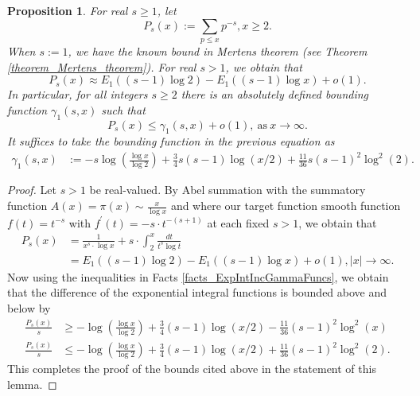\documentclass[11pt,reqno,a4letter]{article}
\numberwithin{figure}{section}
\numberwithin{table}{section}
\theoremstyle{plain}
\newtheorem{prop}[theorem]{Proposition}
\numberwithin{theorem}{section}
\theoremstyle{definition}
\newcommand{\NBRef}[1]{}
\begin{document}
\begin{prop} 
\label{cor_PartialSumsOfReciprocalsOfPrimePowers} 
For real $s \geq 1$, let 
\[
P_s(x) := \sum_{p \leq x} p^{-s}, x \geq 2. 
\]
When $s := 1$, we have the known bound in Mertens theorem 
(see Theorem \ref{theorem_Mertens_theorem}). For real $s > 1$, we obtain that 
\[
P_s(x) \approx E_1((s-1) \log 2) - E_1((s-1) \log x) + o(1). 
\]
In particular, for all integers $s \geq 2$ 
there is an absolutely defined bounding function $\gamma_1(s, x)$ such that 
\[
P_s(x) \leq \gamma_1(s, x) + o(1), \mathrm{\ as\ } x \rightarrow \infty. 
\] 
It suffices to take the bounding function in the previous equation as 
\begin{align*}
\gamma_1(s, x) & := -s\log\left(\frac{\log x}{\log 2}\right) + \frac{3}{4}s(s-1) \log(x/2) + 
     \frac{11}{36} s(s-1)^2 \log^2(2). 
\end{align*}
\end{prop} 
\NBRef{A05-2020-04-26} 
\begin{proof} 
Let $s > 1$ be real-valued. 
By Abel summation with the summatory function $A(x) = \pi(x) \sim \frac{x}{\log x}$ and where 
our target function smooth function $f(t) = t^{-s}$ with 
$f^{\prime}(t) = -s \cdot t^{-(s+1)}$ at each fixed $s > 1$, we obtain that 
\begin{align*} 
P_s(x) & = \frac{1}{x^s \cdot \log x} + s \cdot \int_2^{x} \frac{dt}{t^s \log t} \\ 
     & = E_1((s-1) \log 2) - E_1((s-1) \log x) + o(1), |x| \rightarrow \infty. 
\end{align*} 
Now using the inequalities in Facts \ref{facts_ExpIntIncGammaFuncs}, we obtain that the 
difference of the exponential integral functions is bounded above and below by 
\begin{align*} 
\frac{P_s(x)}{s} & \geq -\log\left(\frac{\log x}{\log 2}\right) + \frac{3}{4}(s-1) \log(x/2) - 
     \frac{11}{36} (s-1)^2 \log^2(x) \\ 
\frac{P_s(x)}{s} & \leq -\log\left(\frac{\log x}{\log 2}\right) + \frac{3}{4}(s-1) \log(x/2) + 
     \frac{11}{36} (s-1)^2 \log^2(2). 
\end{align*} 
This completes the proof of the bounds cited above in the statement of this lemma. 
\end{proof} 
\end{document}
